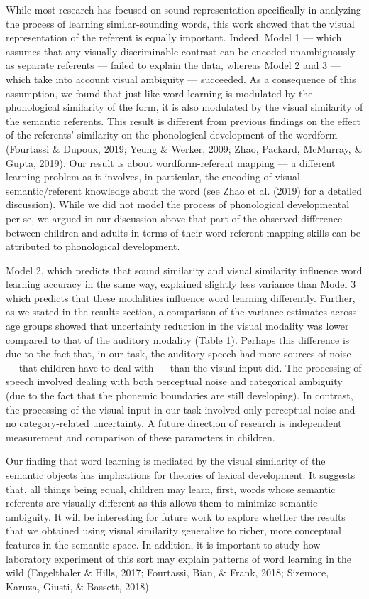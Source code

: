 \documentclass[english,,man]{apa6}
\begin{document}
While most research has focused on sound representation specifically in analyzing the process of learning similar-sounding words, this work showed that the visual representation of the referent is equally important. Indeed, Model 1 --- which assumes that any visually discriminable contrast can be encoded unambiguously as separate referents --- failed to explain the data, whereas Model 2 and 3 --- which take into account visual ambiguity --- succeeded. As a consequence of this assumption, we found that just like word learning is modulated by the phonological similarity of the form, it is also modulated by the visual similarity of the semantic referents. This result is different from previous findings on the effect of the referents' similarity on the phonological development of the wordform (Fourtassi \& Dupoux, 2019; Yeung \& Werker, 2009; Zhao, Packard, McMurray, \& Gupta, 2019). Our result is about wordform-referent mapping --- a different learning problem as it involves, in particular, the encoding of visual semantic/referent knowledge about the word (see Zhao et al. (2019) for a detailed discussion). While we did not model the process of phonological developmental per se, we argued in our discussion above that part of the observed difference between children and adults in terms of their word-referent mapping skills can be attributed to phonological development.

Model 2, which predicts that sound similarity and visual similarity influence word learning accuracy in the same way, explained slightly less variance than Model 3 which predicts that these modalities influence word learning differently. Further, as we stated in the results section, a comparison of the variance estimates across age groups showed that uncertainty reduction in the visual modality was lower compared to that of the auditory modality (Table 1). Perhaps this difference is due to the fact that, in our task, the auditory speech had more sources of noise --- that children have to deal with --- than the visual input did. The processing of speech involved dealing with both perceptual noise and categorical ambiguity (due to the fact that the phonemic boundaries are still developing). In contrast, the processing of the visual input in our task involved only perceptual noise and no category-related uncertainty. A future direction of research is independent measurement and comparison of these parameters in children.

Our finding that word learning is mediated by the visual similarity of the semantic objects has implications for theories of lexical development. It suggests that, all things being equal, children may learn, first, words whose semantic referents are visually different as this allows them to minimize semantic ambiguity. It will be interesting for future work to explore whether the results that we obtained using visual similarity generalize to richer, more conceptual features in the semantic space. In addition, it is important to study how laboratory experiment of this sort may explain patterns of word learning in the wild (Engelthaler \& Hills, 2017; Fourtassi, Bian, \& Frank, 2018; Sizemore, Karuza, Giusti, \& Bassett, 2018).
\end{document}
